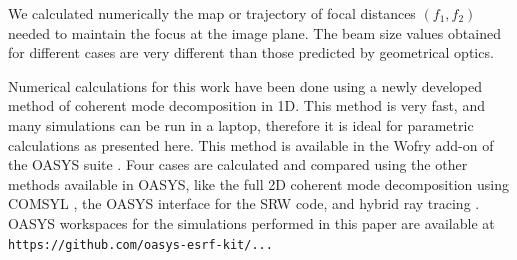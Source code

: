\documentclass{iucr}              %
\begin{document}
We calculated numerically the map or trajectory of focal distances $(f_1,f_2)$ needed to maintain the focus at the image plane. The beam size values obtained for different cases are very different than those predicted by geometrical optics.  

Numerical calculations for this work have been done using a newly developed method of coherent mode decomposition in 1D. This method is very fast, and many simulations can be run in a laptop, therefore it is ideal for parametric calculations as presented here. This method is available in the Wofry add-on of the OASYS suite \cite{codeOASYS}. Four cases are calculated and compared using the other methods available in OASYS, like the full 2D coherent mode decomposition using COMSYL \cite{codeCOMSYL}, the OASYS interface for the SRW \cite{codeSRW} code, and hybrid ray tracing \cite{codeHYBRID}. OASYS workspaces for the simulations performed in this paper are available at {\tt https://github.com/oasys-esrf-kit/...} 

\appendix






    


    
    
\end{document}
